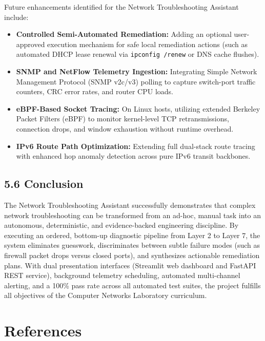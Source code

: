 \documentclass[
]{article}
\providecommand{\tightlist}{%
  \setlength{\itemsep}{0pt}\setlength{\parskip}{0pt}}
\begin{document}
Future enhancements identified for the Network Troubleshooting Assistant include:
\begin{itemize}
\tightlist
\item \textbf{Controlled Semi-Automated Remediation:} Adding an optional user-approved execution mechanism for safe local remediation actions (such as automated DHCP lease renewal via \texttt{ipconfig /renew} or DNS cache flushes).
\item \textbf{SNMP and NetFlow Telemetry Ingestion:} Integrating Simple Network Management Protocol (SNMP v2c/v3) polling to capture switch-port traffic counters, CRC error rates, and router CPU loads.
\item \textbf{eBPF-Based Socket Tracing:} On Linux hosts, utilizing extended Berkeley Packet Filters (eBPF) to monitor kernel-level TCP retransmissions, connection drops, and window exhaustion without runtime overhead.
\item \textbf{IPv6 Route Path Optimization:} Extending full dual-stack route tracing with enhanced hop anomaly detection across pure IPv6 transit backbones.
\end{itemize}

\subsection{5.6 Conclusion}\label{conclusion}

The Network Troubleshooting Assistant successfully demonstrates that complex network troubleshooting can be transformed from an ad-hoc, manual task into an autonomous, deterministic, and evidence-backed engineering discipline. By executing an ordered, bottom-up diagnostic pipeline from Layer 2 to Layer 7, the system eliminates guesswork, discriminates between subtle failure modes (such as firewall packet drops versus closed ports), and synthesizes actionable remediation plans. With dual presentation interfaces (Streamlit web dashboard and FastAPI REST service), background telemetry scheduling, automated multi-channel alerting, and a 100\% pass rate across all automated test suites, the project fulfills all objectives of the Computer Networks Laboratory curriculum.

\newpage

\section{References}\label{references}
\end{document}
